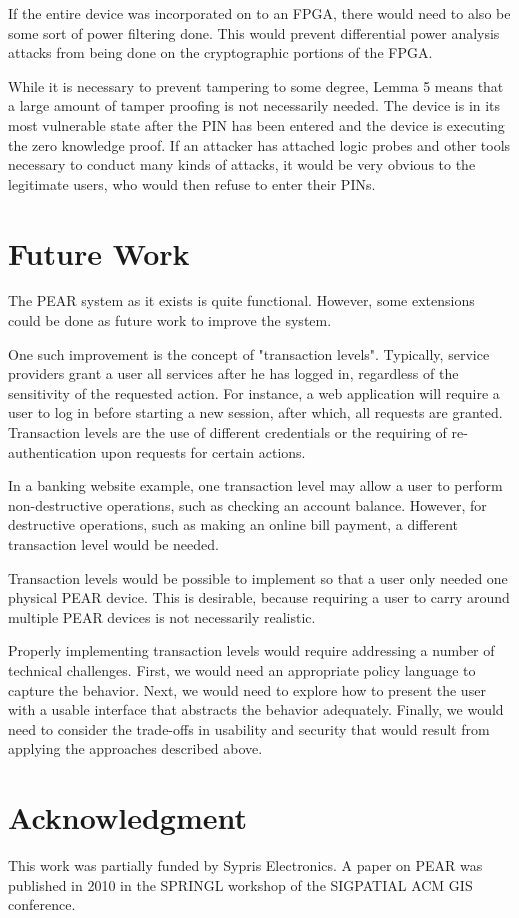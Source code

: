 If the entire device was incorporated on to an FPGA, there would need to also be some sort of power filtering done.
This would prevent differential power analysis attacks from being done on the cryptographic portions of the FPGA.

While it is necessary to prevent tampering to some degree, Lemma 5 means that a large amount of tamper proofing
is not necessarily needed. The device is in its most vulnerable state after the PIN has been entered and the device is
executing the zero knowledge proof. If an attacker has attached logic probes and other tools necessary to conduct
many kinds of attacks, it would be very obvious to the legitimate users, who would then refuse to enter their PINs.

\section{Future Work}
The PEAR system as it exists is quite functional. However, some extensions could be done as future work to improve
the system. 

One such improvement is the concept of "transaction levels". Typically, service providers grant a user all services after
he has logged in, regardless of the sensitivity of the requested action. For instance, a web application will require a
user to log in before starting a new session, after which, all requests are granted. Transaction levels are the use of
different credentials or the requiring of re-authentication upon requests for certain actions. 

In a banking website 
example, one transaction level may allow a user to perform non-destructive operations, such as checking an account
balance. However, for destructive operations, such as making an online bill payment, a different transaction level
would be needed.

Transaction levels would be possible to implement so that a user only needed one physical PEAR device. This is
desirable, because requiring a user to carry around multiple PEAR devices is not necessarily realistic.

Properly implementing transaction levels would require addressing a number of technical challenges. First, we would 
need an appropriate policy language to capture the behavior. Next, we would need to explore how to present the user 
with a usable interface that abstracts the behavior adequately. Finally, we would need to consider the trade-offs in 
usability and security that would result from applying the approaches described above.

\section{Acknowledgment}
This work was partially funded by Sypris Electronics. A paper on PEAR was published in 2010 in the SPRINGL workshop
of the SIGPATIAL ACM GIS conference.~\cite{PEAR}